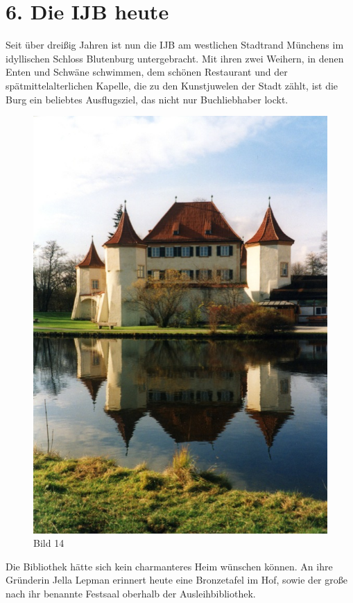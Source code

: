 \documentclass[a4paper,
fontsize=11pt,
oneside,
numbers=noperiodatend,
parskip=half-,
bibliography=totoc,
final
]{scrartcl}
\begin{document}
\section*{6. Die IJB heute}\label{die-ijb-heute}

Seit über dreißig Jahren ist nun die IJB am westlichen Stadtrand
Münchens im idyllischen Schloss Blutenburg untergebracht. Mit ihren zwei
Weihern, in denen Enten und Schwäne schwimmen, dem schönen Restaurant
und der spätmittelalterlichen Kapelle, die zu den Kunstjuwelen der Stadt
zählt, ist die Burg ein beliebtes Ausflugsziel, das nicht nur
Buchliebhaber lockt.~

\begin{figure}[htbp]
\centering
\includegraphics{img/Bild14.jpg}
\caption{Bild 14}
\end{figure}

Die Bibliothek hätte sich kein charmanteres Heim wünschen können. An
ihre Gründerin Jella Lepman erinnert heute eine Bronzetafel im Hof,
sowie der große nach ihr benannte Festsaal oberhalb der
Ausleihbibliothek.
\end{document}
